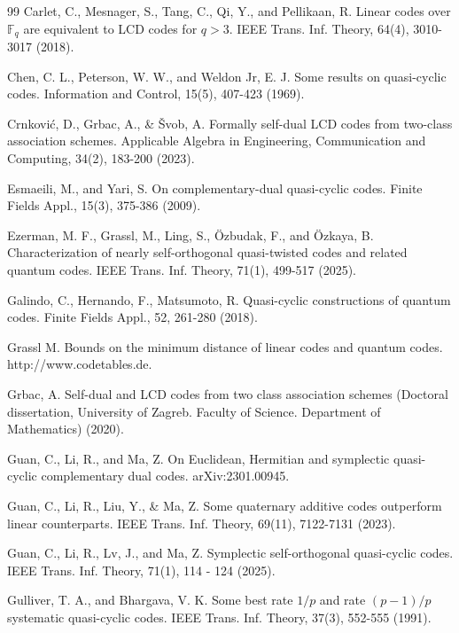 \documentclass[a4paper,12pt]{article}
\begin{document}
\begin{thebibliography}{99}
 Carlet, C., Mesnager, S., Tang, C., Qi, Y., and Pellikaan, R. Linear codes over $\mathbb F_q $ are equivalent to LCD codes for $ q> 3$. 
IEEE Trans. Inf. Theory, 64(4), 3010-3017 (2018). 


Chen, C. L., Peterson, W. W., and Weldon Jr, E. J. Some results on quasi-cyclic codes. Information and Control, 15(5), 407-423 (1969). 

Crnkovi{\'c}, D., Grbac, A., \& \v{S}vob, A. Formally self-dual LCD codes from two-class association schemes. Applicable Algebra in Engineering, Communication and Computing, 34(2), 183-200 (2023). 

Esmaeili, M., and Yari, S. On complementary-dual quasi-cyclic codes. 
Finite Fields Appl., 15(3), 375-386 (2009). 

Ezerman, M. F., Grassl, M., Ling, S., \"Ozbudak, F., and \"Ozkaya, B. 
Characterization of nearly self-orthogonal quasi-twisted codes and related quantum codes. 
IEEE Trans. Inf. Theory, 71(1), 499-517 (2025).


Galindo, C., Hernando, F., Matsumoto, R.  Quasi-cyclic constructions of quantum codes. 
Finite Fields Appl., 52, 261-280  (2018).


 Grassl M. Bounds on the minimum distance of linear codes and quantum codes. http://www.codetables.de.

 Grbac, A. Self-dual and LCD codes from two class association schemes (Doctoral dissertation, University of Zagreb. Faculty of Science. Department of Mathematics)  (2020).

 Guan, C., Li, R., and Ma, Z. On Euclidean, Hermitian and symplectic quasi-cyclic complementary dual codes.  arXiv:2301.00945. 

 Guan, C., Li, R., Liu, Y., \& Ma, Z. Some quaternary additive codes outperform linear counterparts. 
IEEE Trans. Inf. Theory, 69(11), 7122-7131 (2023). 

 Guan, C., Li, R., Lv, J., and Ma, Z. Symplectic self-orthogonal quasi-cyclic codes. 
IEEE Trans. Inf. Theory, 71(1),  114 - 124  (2025). 



Gulliver, T. A., and Bhargava, V. K. Some best rate $1/p$ and rate $(p-1)/p$ systematic quasi-cyclic codes. 
IEEE Trans. Inf. Theory, 37(3), 552-555  (1991). 
 

\end{thebibliography}
\end{document}
